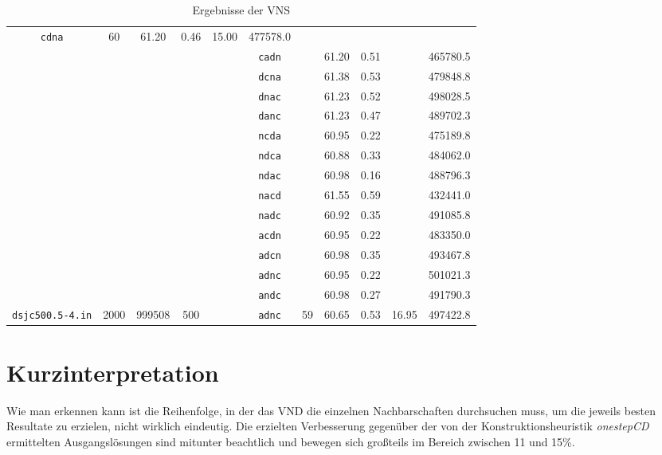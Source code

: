 \begin{table}[p]
\begin{tabular}{|c|ccc|c|c|ccc|c|c|}
      \texttt{cdna}	& \multirow{14}{*}{60}	& 61.20	& 0.46	& \multirow{14}{*}{15.00}	& 477578.0\\
&&&&& \texttt{cadn}	&			& 61.20	& 0.51	&				& 465780.5\\
&&&&& \texttt{dcna}	&			& 61.38	& 0.53	&				& 479848.8\\
&&&&& \texttt{dnac}	&			& 61.23	& 0.52	&				& 498028.5\\
&&&&& \texttt{danc}	&			& 61.23	& 0.47	&				& 489702.3\\
&&&&& \texttt{ncda}	&			& 60.95	& 0.22	&				& 475189.8\\
&&&&& \texttt{ndca}	&			& 60.88	& 0.33	&				& 484062.0\\
&&&&& \texttt{ndac}	&			& 60.98	& 0.16	&				& 488796.3\\
&&&&& \texttt{nacd}	&			& 61.55	& 0.59	&				& 432441.0\\
&&&&& \texttt{nadc}	&			& 60.92	& 0.35	&				& 491085.8\\
&&&&& \texttt{acdn}	&			& 60.95	& 0.22	&				& 483350.0\\
&&&&& \texttt{adcn}	&			& 60.98	& 0.35	&				& 493467.8\\
&&&&& \texttt{adnc}	&			& 60.95	& 0.22	&				& 501021.3\\
&&&&& \texttt{andc}	&			& 60.98	& 0.27	&				& 491790.3\\
\cline{1-4}\cline{6-11}
\texttt{dsjc500.5-4.in} & 2000 & 999508 & 500 & & \texttt{adnc} & 59 & 60.65 & 0.53 & 16.95 & 497422.8\\
\hline
\end{tabular}
\caption{Ergebnisse der VNS}
\label{tab:result}
\end{table}

\section{Kurzinterpretation}
Wie man erkennen kann ist die Reihenfolge, in der das VND die einzelnen Nachbarschaften durchsuchen muss, um die jeweils besten Resultate zu erzielen, nicht wirklich eindeutig. Die erzielten Verbesserung gegenüber der von der Konstruktionsheuristik \emph{onestepCD} ermittelten Ausgangslösungen sind mitunter beachtlich und bewegen sich großteils im Bereich zwischen 11 und 15\%.
